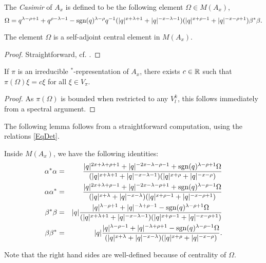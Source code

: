 \begin{Def} The \emph{Casimir} of $A_x$ is defined to be the following element $\Omega\in M(A_x)$, \[\Omega =q^{\lambda-\rho+1}+q^{\rho-\lambda-1} - \operatorname{\mathrm{sgn}}(q)^{\lambda-\rho}q^{-1}(|q|^{x+\lambda+1}+|q|^{-x-\lambda-1})(|q|^{x+\rho-1}+|q|^{-x-\rho+1})\beta^*\beta.\] 
\end{Def}

\begin{Lem} The element $\Omega$ is a self-adjoint central element in $M(A_x)$.
\end{Lem}
\begin{proof}
Straightforward, cf. \cite[Lemma 3.3]{KoR1}.
\end{proof}

\begin{Cor}\label{CorCas} If $\pi$ is an irreducible $^*$-representation of $A_x$, there exists $c\in \mathbb{R}$ such that $\pi(\Omega)\xi = c\xi$ for all $\xi \in V_{\pi}$. 
\end{Cor} 
\begin{proof} As $\pi(\Omega)$ is bounded when restricted to any $V^k_l$, this follows immediately from a spectral argument. 
\end{proof} 

The following lemma follows from a straightforward computation, using the relations \eqref{EqDet}.

\begin{Lem}\label{LemAmp} Inside $M(A_x)$, we have the following identities:
\begin{eqnarray*}
\alpha^*\alpha &=& \frac{|q|^{2x+\lambda+\rho+1}+|q|^{-2x-\lambda-\rho-1}+\operatorname{\mathrm{sgn}}(q)^{\lambda-\rho+1}\Omega}{(|q|^{x+\lambda+1}+|q|^{-x-\lambda-1})(|q|^{x+\rho}+|q|^{-x-\rho})}\\
\alpha\alpha^* &=& \frac{|q|^{2x+\lambda+\rho-1}+|q|^{-2x-\lambda-\rho+1}+\operatorname{\mathrm{sgn}}(q)^{\lambda-\rho-1}\Omega}{(|q|^{x+\lambda}+|q|^{-x-\lambda})(|q|^{x+\rho-1}+|q|^{-x-\rho+1})}\\
\beta^*\beta &=& |q|\frac{|q|^{\lambda-\rho+1}+|q|^{-\lambda+\rho-1}-\operatorname{\mathrm{sgn}}(q)^{\lambda-\rho+1}\Omega}{(|q|^{x+\lambda+1}+|q|^{-x-\lambda-1})(|q|^{x+\rho-1}+|q|^{-x-\rho+1})}\\
\beta\beta^* &=&  |q|\frac{|q|^{\lambda-\rho-1}+|q|^{-\lambda+\rho+1}-\operatorname{\mathrm{sgn}}(q)^{\lambda-\rho-1}\Omega}{(|q|^{x+\lambda}+|q|^{-x-\lambda})(|q|^{x+\rho}+|q|^{-x-\rho})}.
\end{eqnarray*}
\end{Lem}

Note that the right hand sides are well-defined because of centrality of $\Omega$.

